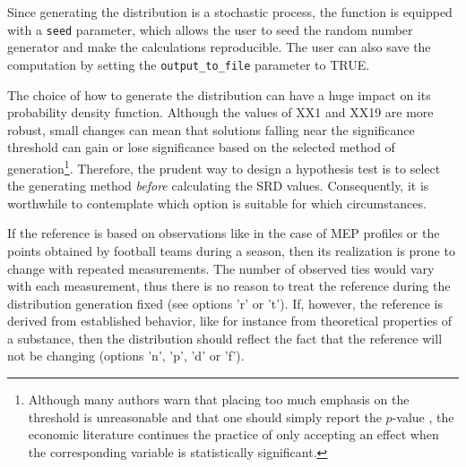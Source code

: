 Since generating the distribution is a stochastic process, the function is equipped with a \texttt{seed} parameter, which allows the user to seed the random number generator and make the calculations reproducible. The user can also save the computation by setting the \texttt{output\_to\_file} parameter to TRUE.

The choice of how to generate the distribution can have a huge impact on its probability density function. Although the values of XX1 and XX19 are more robust, small changes can mean that solutions falling near the significance threshold can gain or lose significance based on the selected method of generation\footnote{Although many authors warn that placing too much emphasis on the threshold is unreasonable and that one should simply report the $p$-value \citep{Wasserstein2016,Berrar2022}, the economic literature continues the practice of only accepting an effect when the corresponding variable is statistically significant.}. Therefore, the prudent way to design a hypothesis test is to select the generating method \textit{before} calculating the SRD values. Consequently, it is worthwhile to contemplate which option is suitable for which circumstances.

If the reference is based on observations like in the case of MEP profiles or the points obtained by football teams during a season, then its realization is prone to change with repeated measurements. The number of observed ties would vary with each measurement, thus there is no reason to treat the reference during the distribution generation fixed (see options 'r' or 't'). If, however, the reference is derived from established behavior, like for instance from theoretical properties of a substance, then the distribution should reflect the fact that the reference will not be changing (options 'n', 'p', 'd' or 'f').

